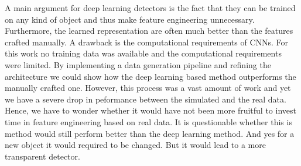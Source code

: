 A main argument for deep learning detectors is the fact that they can be trained on any kind of object and thus make feature engineering unnecessary. Furthermore, the learned representation are often much better than the features crafted manually. A drawback is the computational requirements of \acp{CNN}. For this work no training data was available and the computational requirements were limited. By implementing a data generation pipeline and refining the architecture we could show how the deep learning based method outperforms the manually crafted one. However, this process was a vast amount of work and yet we have a severe drop in peformance between the simulated and the real data. Hence, we have to wonder whether it would have not been more fruitful to invest time in feature engineering based on real data. It is questionable whether this is method would still perform better than the deep learning method. And yes for a new object it would required to be changed. But it would lead to a more transparent detector.

